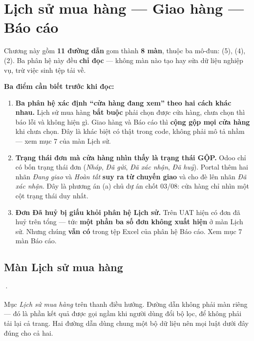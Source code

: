 \chapter{Lịch sử mua hàng --- Giao hàng --- Báo cáo}

Chương này gồm \textbf{11 đường dẫn} gom thành \textbf{8 màn}, thuộc ba mô-đun:
 (5),  (4),
 (2). Ba phân hệ này đều \textbf{chỉ đọc} --- không màn nào tạo hay sửa
dữ liệu nghiệp vụ, trừ việc sinh tệp tải về.

\textbf{Ba điểm cần biết trước khi đọc:}

\begin{enumerate}[leftmargin=*]
  \item \textbf{Ba phân hệ xác định ``cửa hàng đang xem'' theo hai cách khác nhau.} Lịch sử mua
        hàng \textbf{bắt buộc} phải chọn được cửa hàng, chưa chọn thì báo lỗi và không hiện gì.
        Giao hàng và Báo cáo thì \textbf{cộng gộp mọi cửa hàng} khi chưa chọn. Đây là khác biệt
        có thật trong code, không phải mô tả nhầm --- xem mục 7 của màn Lịch sử.
  \item \textbf{Trạng thái đơn mà cửa hàng nhìn thấy là trạng thái GỘP.} Odoo chỉ có bốn trạng
        thái đơn (\emph{Nháp}, \emph{Đã gửi}, \emph{Đã xác nhận}, \emph{Đã huỷ}). Portal thêm
        hai nhãn \emph{Đang giao} và \emph{Hoàn tất} \textbf{suy ra từ chuyến giao} và cho đè
        lên nhãn \emph{Đã xác nhận}. Đây là phương án (a) chủ dự án chốt 03/08: cửa hàng chỉ
        nhìn một cột trạng thái duy nhất.
  \item \textbf{Đơn Đã huỷ bị giấu khỏi phân hệ Lịch sử.} Trên UAT hiện có  đơn đã huỷ
        trên tổng  --- tức \textbf{một phần ba số đơn không xuất hiện} ở màn Lịch sử.
        Nhưng chúng \textbf{vẫn có} trong tệp Excel của phân hệ Báo cáo. Xem mục 7 màn Báo cáo.
\end{enumerate}

\section{Màn Lịch sử mua hàng}
 · 
\medskip

\mvao

Mục \emph{Lịch sử mua hàng} trên thanh điều hướng. Đường dẫn  không phải màn
riêng --- đó là phần kết quả được gọi ngầm khi người dùng đổi bộ lọc, để không phải tải lại cả
trang. Hai đường dẫn dùng chung một bộ dữ liệu nên mọi luật dưới đây đúng cho cả hai.

